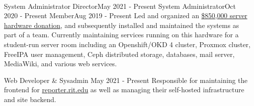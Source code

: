 \vspace{1.5pt} %


\cvtag{\LaTeX}
\medskip
\\

\vspace{6pt} %

    {System Administrator Director}{May 2021 - Present}
    {System Administrator}{Oct 2020 - Present}
    {Member}{Aug 2019 - Present}
    {Led and organized an \href{https://www.rit.edu/news/wayfair-gifts-850000-servers-rits-computer-science-house}{\$850,000 server hardware donation}, and subsequently installed and maintained the systems as part of a team. Currently maintaining services running on this hardware for a student-run server room including an Openshift/OKD 4 cluster, Proxmox cluster, FreeIPA user management, Ceph distributed storage, databases, mail server, MediaWiki, and various web services.} 

    {Web Developer \& Sysadmin} {May 2021 - Present}
    {Responsible for maintaining the frontend for \href{https://reporter.rit.edu}{reporter.rit.edu} as well as managing their self-hosted infrastructure and site backend.}